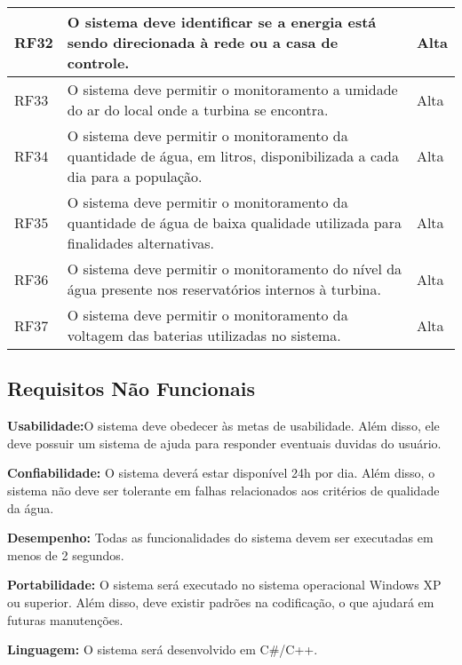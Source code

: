 \documentclass[12pt,openright,oneside,a4paper,brazil]{abntex2}
\begin{document}
\begin{longtable}{|p{4cm}|p{9cm}|p{2cm}|}
RF32& 	O sistema deve identificar se a energia está sendo direcionada à rede ou a casa de controle.	& Alta\\ \hline
RF33& 	O sistema deve permitir o monitoramento a umidade do ar do local onde a turbina se encontra. 	& Alta\\ \hline
RF34& 	O sistema deve permitir o monitoramento da quantidade de água, em litros, disponibilizada a cada dia para a população.& 	Alta\\ \hline
RF35& 	O sistema deve permitir o monitoramento da quantidade de água de baixa qualidade utilizada para finalidades alternativas.& 	Alta\\ \hline
RF36& 	O sistema deve permitir o monitoramento do nível da água presente nos reservatórios internos à turbina.	& Alta\\ \hline
RF37& 	O sistema deve permitir o monitoramento da voltagem das baterias utilizadas no sistema.	& Alta\\ \hline

\end{longtable}

\subsection*{Requisitos Não Funcionais}
\textbf{Usabilidade:}O sistema deve obedecer às metas de usabilidade. Além disso, ele deve possuir um sistema de ajuda para responder eventuais duvidas do usuário.

\textbf{Confiabilidade:} O sistema deverá estar disponível 24h por dia. Além disso, o sistema não deve ser tolerante em falhas relacionados aos critérios de qualidade da água.

\textbf{Desempenho:} Todas as funcionalidades do sistema devem ser executadas em menos de 2 segundos.

\textbf{Portabilidade:} O sistema será executado no sistema operacional Windows XP ou superior. Além disso, deve existir padrões na codificação, o que ajudará em futuras manutenções.

\textbf{Linguagem:} O sistema será desenvolvido em C\#/C++.
\end{document}
